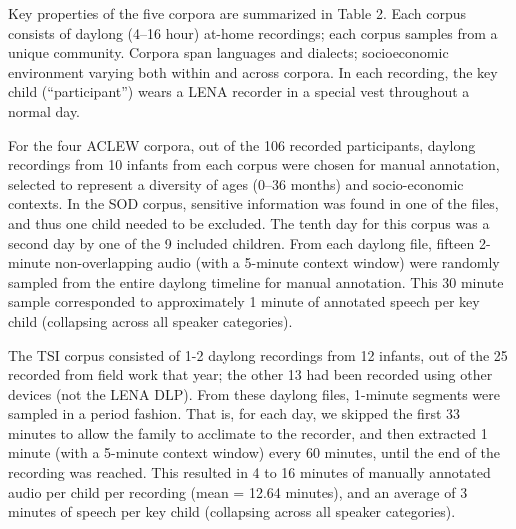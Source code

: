 \documentclass[english,floatsintext,man]{apa6}
\begin{document}
Key properties of the five corpora are summarized in Table 2. Each
corpus consists of daylong (4--16 hour) at-home recordings; each corpus
samples from a unique community. Corpora span languages and dialects;
socioeconomic environment varying both within and across corpora. In
each recording, the key child (\enquote{participant}) wears a LENA
recorder in a special vest throughout a normal day.

For the four ACLEW corpora, out of the 106 recorded participants,
daylong recordings from 10 infants from each corpus were chosen for
manual annotation, selected to represent a diversity of ages (0--36
months) and socio-economic contexts. In the SOD corpus, sensitive
information was found in one of the files, and thus one child needed to
be excluded. The tenth day for this corpus was a second day by one of
the 9 included children. From each daylong file, fifteen 2-minute
non-overlapping audio (with a 5-minute context window) were randomly
sampled from the entire daylong timeline for manual annotation. This 30
minute sample corresponded to approximately 1 minute of annotated speech
per key child (collapsing across all speaker categories).

The TSI corpus consisted of 1-2 daylong recordings from 12 infants, out
of the 25 recorded from field work that year; the other 13 had been
recorded using other devices (not the LENA DLP). From these daylong
files, 1-minute segments were sampled in a period fashion. That is, for
each day, we skipped the first 33 minutes to allow the family to
acclimate to the recorder, and then extracted 1 minute (with a 5-minute
context window) every 60 minutes, until the end of the recording was
reached. This resulted in 4 to 16 minutes of manually annotated audio
per child per recording (mean = 12.64 minutes), and an average of 3
minutes of speech per key child (collapsing across all speaker
categories).
\end{document}
